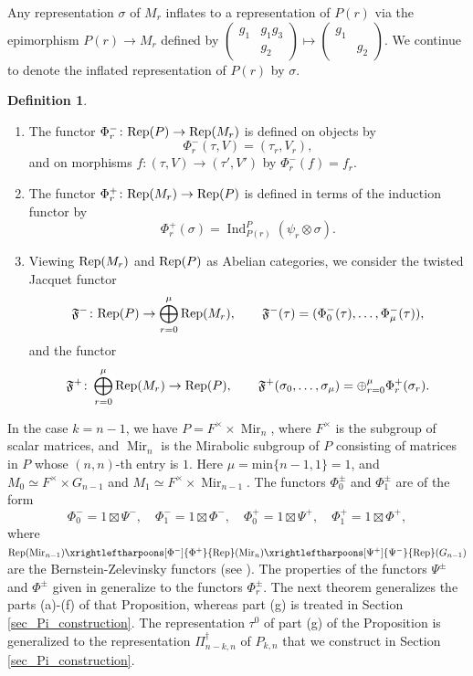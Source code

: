 \documentclass[reqno]{amsart}
\theoremstyle{definition}
\newtheorem{definition}[theorem]{Definition}
\theoremstyle{remark}
\numberwithin{equation}{section}
\newcommand{\fF}{\mathfrak F}
\DeclareMathOperator{\Ind}{Ind}
\DeclareMathOperator{\Mir}{Mir}
\newcommand{\bbsm}{\left (\begin{smallmatrix}}      \newcommand{\besm}{\end{smallmatrix}\right )}
\begin{document}
Any representation $\sigma$ of $M_r$ inflates to a representation of $P(r)$ via the epimorphism $P(r) \to M_r$ defined by $\bbsm g_1 & g_1g_3\\ & g_2 \besm \mapsto \bbsm g_1 & \\ & g_2 \besm$. We continue to denote the inflated representation of $P(r)$ by $\sigma$.
\begin{definition} \label{Phi_r_def} \hfill  \begin{enumerate}
\item The functor $\Phi_r^- \colon {\rm Rep}(P) \to {\rm Rep}(M_r)$ is defined on objects by 
\[ \Phi_r^-(\tau,V)=(\tau_r,V_r),\] and on morphisms $f:(\tau,V) \to (\tau',V')$ by $\Phi_r^-(f)=f_r$. \\

\item The functor $\Phi_r^+\colon  {\rm Rep}(M_r) \to {\rm Rep}(P)$ is defined in terms of  the induction functor by \[ \Phi_r^+(\sigma)=\Ind_{P(r)}^P (\psi_r \otimes \sigma).\]
\item Viewing ${\rm Rep}(M_r)$ and $ {\rm Rep}(P)$ as Abelian categories, we consider the twisted Jacquet functor 
\[ \fF^- \colon {\rm Rep}(P) \to \bigoplus_{r=0}^\mu {\rm Rep}(M_r), \qquad \fF^-(\tau)=(\Phi_0^-(\tau), \dots, \Phi_{\mu}^-(\tau)),  \]
and the functor
\[ \fF^+ \colon  \bigoplus_{r=0}^\mu {\rm Rep}(M_r) \to {\rm Rep}(P), \qquad \fF^+(\sigma_0, \dots, \sigma_\mu) = \oplus_{r=0}^\mu \Phi^+_r(\sigma_r).  \]
\end{enumerate}
\end{definition}
In the case $k=n-1$, we have $P=F^\times \times \Mir_n$, where 
$F^\times$ is the subgroup of scalar matrices, and $\Mir_n$ is the Mirabolic subgroup of $P$ consisting of matrices in $P$ whose $(n,n)$-th entry is $1$. Here $\mu=\text{min}\{n-1,1\}=1$, and  $M_0 \simeq F^\times  \times G_{n-1}$ and $M_1 \simeq F^\times  \times \Mir_{n-1}$. The functors $\Phi_0^{\pm}$ and $\Phi^{\pm}_1$ are of the form \[\Phi_0^-=1 \boxtimes \Psi^-, \quad \Phi_1^-=1 \boxtimes \Phi^-, \quad  
\Phi_0^+=1 \boxtimes \Psi^+, \quad \Phi_1^+=1 \boxtimes \Phi^+,\]
where $ {\rm Rep}(\Mir_{n-1}) \xrightleftharpoons
[\Phi^-]{\Phi^+} {\rm Rep}(\Mir_n)
\xrightleftharpoons
[\Psi^+]{\Psi^-} {\rm Rep}(G_{n-1})$
are the Bernstein-Zelevinsky functors  
(see \cite[Section 5.11]{BerZel[2]}).
The properties of the functors $\Psi^{\pm}$ and $\Phi^{\pm}$ given in \cite[Proposition 5.12]{BerZel[2]} generalize to the functors $\Phi_r^{\pm}$. The next theorem generalizes the parts (a)-(f) of that Proposition, whereas part (g) is treated in Section \ref{sec_Pi_construction}. The representation $\tau^0$ of part (g) of the Proposition is generalized to the representation $\Pi_{n-k,n}^\dagger$ of $P_{k,n}$ that we construct in Section \ref{sec_Pi_construction}.
\end{document}
